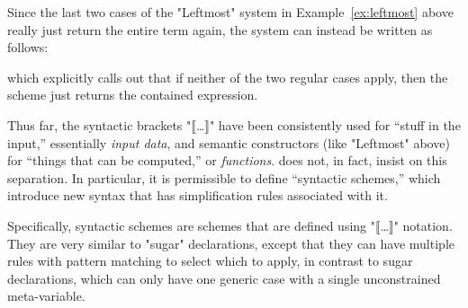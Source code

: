 \documentclass[11pt]{article} %
\begin{document}
\begin{notation}
\begin{enumerate}

\end{enumerate}
\end{notation}

\begin{example}
  Since the last two cases of the "Leftmost" system in Example~\ref{ex:leftmost} above really just
  return the entire term again, the system can instead be written as follows:
  which explicitly calls out that if neither of the two regular cases apply, then the scheme just
  returns the contained expression.
\end{example}

Thus far, the syntactic brackets "⟦…⟧" have been consistently used for ``stuff in the input,''
essentially \emph{input data}, and semantic constructors (like "Leftmost" above) for ``things that
can be computed,'' or \emph{functions}. \HAX does not, in fact, insist on this separation. In
particular, it is permissible to define ``syntactic schemes,'' which introduce new syntax that has
simplification rules associated with it.

Specifically, syntactic schemes are schemes that are defined using "⟦…⟧" notation. They are very
similar to "sugar" declarations, except that they can have multiple rules with pattern matching to
select which to apply, in contrast to sugar declarations, which can only have one generic case with
a single unconstrained meta-variable.
\end{document}
